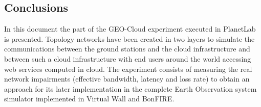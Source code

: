 





\subsection{Conclusions}
In this document the part of the GEO-Cloud experiment executed in PlanetLab is presented. Topology networks have been created in two layers to simulate the communications between the ground stations and the cloud infrastructure and between such a cloud infrastructure with end users around the world accessing web services computed in cloud. The experiment consists of measuring the real network impairments (effective bandwidth, latency and loss rate) to obtain an approach for its later implementation in the complete Earth Observation system simulator implemented in Virtual Wall and BonFIRE. 